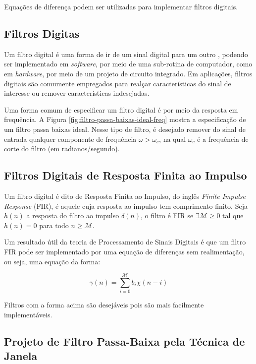 {Equações de diferença podem ser utilizadas para implementar filtros digitais.

\subsection{Filtros Digitas}

Um filtro digital é uma forma de ir de um sinal digital para um outro
\cite{classnote-on-intro-to-digital-filters}, podendo ser implementado em
\textit{software}, por meio de uma sub-rotina de computador, como em
\textit{hardware}, por meio de um projeto de circuito integrado. Em aplicações,
filtros digitais são comumente empregados para realçar características do sinal
de interesse ou remover características indesejadas.

Uma forma comum de especificar um filtro digital é por meio da resposta em
frequência. A Figura \ref{fig:filtro-passa-baixas-ideal-freq} mostra a
especificação de um filtro passa baixas ideal. Nesse tipo de filtro, é desejado
remover do sinal de entrada qualquer componente de frequência $\omega >
\omega_c$, na qual $\omega_c$ é a frequência de corte do filtro (em
radianos/segundo).

\subsection{Filtros Digitais de Resposta Finita ao Impulso}

Um filtro digital é dito de 
Resposta Finita ao Impulso, do inglês \textit{Finite Impulse Response} (FIR), é
aquele cuja resposta ao impulso tem comprimento finito. Seja $h(n)$ a resposta
do filtro ao impulso $\delta(n)$, o filtro é FIR se $\exists \mathcal{M} \geq 0$
tal que $h(n) = 0$ para todo $n \geq \mathcal{M}$.

Um resultado útil da teoria de Processamento de Sinais Digitais é que um filtro
FIR pode ser implementado por uma equação de diferenças sem realimentação, ou
seja, uma equação da forma:

\begin{equation}
    \gamma(n) = 	\sum_{i=0}^{\mathcal{M}} b_i \chi(n-i)
\end{equation}

Filtros com a forma acima são desejáveis pois são mais facilmente
implementáveis.

\subsection{Projeto de Filtro Passa-Baixa pela Técnica de Janela}

}
